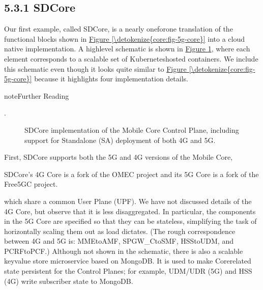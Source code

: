 \documentclass[a4paper,11pt,english]{sphinxmanual}
\let\sphinxpxdimen\pdfpxdimen\else\newdimen\sphinxpxdimen
\begin{document}
\subsection{5.3.1 SD\sphinxhyphen{}Core}
\label{\detokenize{core:sd-core}}
\sphinxAtStartPar
Our first example, called SD\sphinxhyphen{}Core, is a nearly one\sphinxhyphen{}for\sphinxhyphen{}one translation
of the functional blocks shown in \hyperref[\detokenize{core:fig-5g-core}]{Figure \ref{\detokenize{core:fig-5g-core}}}
into a cloud native implementation. A high\sphinxhyphen{}level schematic is shown in
\hyperref[\detokenize{core:fig-sd-core}]{Figure \ref{\detokenize{core:fig-sd-core}}}, where each element corresponds to a
scalable set of Kubernetes\sphinxhyphen{}hosted containers. We include this
schematic even though it looks quite similar to \hyperref[\detokenize{core:fig-5g-core}]{Figure \ref{\detokenize{core:fig-5g-core}}} because it highlights four implementation details.

\label{\detokenize{core:reading-sd-core}}
\begin{sphinxadmonition}{note}{Further Reading}

\sphinxAtStartPar
{}.
\end{sphinxadmonition}

\begin{figure}[ht]
\centering
\capstart

\noindent\sphinxincludegraphics[width=600\sphinxpxdimen]{{Slide22}.png}
\caption{SD\sphinxhyphen{}Core implementation of the Mobile Core Control Plane, including
support for Standalone (SA) deployment of both 4G and 5G.}\label{\detokenize{core:id4}}\label{\detokenize{core:fig-sd-core}}\end{figure}

\sphinxAtStartPar
First, SD\sphinxhyphen{}Core supports both the 5G and 4G versions of the Mobile
Core,%
\begin{footnote}[1]\sphinxAtStartFootnote
SD\sphinxhyphen{}Core’s 4G Core is a fork of the OMEC project and its 5G Core
is a fork of the Free5GC project.
%
\end{footnote} which share a common User Plane (UPF). We have not
discussed details of the 4G Core, but observe that it
is less disaggregated.  In particular, the components in the 5G
Core are specified so that they can be stateless, simplifying the task
of horizontally scaling them out as load dictates. (The rough
correspondence between 4G and 5G is: MME\sphinxhyphen{}to\sphinxhyphen{}AMF, SPGW\_C\sphinxhyphen{}to\sphinxhyphen{}SMF,
HSS\sphinxhyphen{}to\sphinxhyphen{}UDM, and PCRF\sphinxhyphen{}to\sphinxhyphen{}PCF.) Although not shown in the schematic,
there is also a scalable key\sphinxhyphen{}value store microservice based on
MongoDB.  It is used to make Core\sphinxhyphen{}related state persistent for the
Control Planes; for example, UDM/UDR (5G) and HSS (4G) write
subscriber state to MongoDB.
\end{document}
